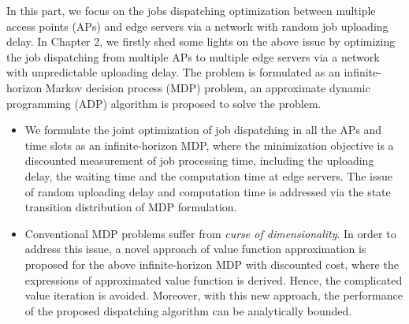 In this part, we focus on the jobs dispatching optimization between multiple access points (APs) and edge servers via a network with random job uploading delay.
In Chapter 2, we firstly shed some lights on the above issue by optimizing the job dispatching from multiple APs to multiple edge servers via a network with unpredictable uploading delay.
The problem is formulated as an infinite-horizon Markov decision process (MDP) problem, an approximate dynamic programming (ADP) algorithm is proposed to solve the problem.
\begin{itemize}
    \item We formulate the joint optimization of job dispatching in all the APs and time slots as an infinite-horizon MDP, where the minimization objective is a discounted measurement of job processing time, including the uploading delay, the waiting time and the computation time  at
        edge servers. The issue of random uploading delay and computation time is addressed via the state transition distribution of MDP formulation.
    \item Conventional MDP problems suffer from \emph{curse of dimensionality}.
    In order to address this issue, a novel approach of value function approximation is proposed for the above infinite-horizon MDP with discounted cost, where the expressions of approximated value function is derived. Hence, the complicated value iteration is avoided. Moreover, with this new approach, the performance of the proposed dispatching algorithm can be analytically bounded. 
\end{itemize}

